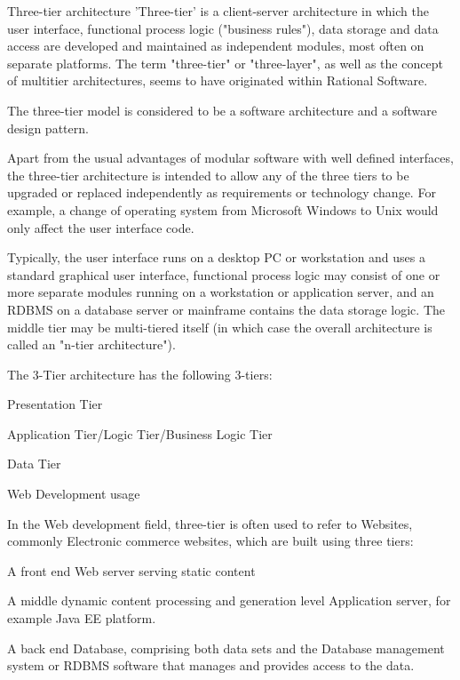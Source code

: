 \begin{obecne}{Three-tier architecture}
'Three-tier' is a client-server architecture in which the user interface, functional process logic ("business rules"), data storage and data access are developed and maintained as independent modules, most often on separate platforms. The term "three-tier" or "three-layer", as well as the concept of multitier architectures, seems to have originated within Rational Software.

The three-tier model is considered to be a software architecture and a software design pattern.

Apart from the usual advantages of modular software with well defined interfaces, the three-tier architecture is intended to allow any of the three tiers to be upgraded or replaced independently as requirements or technology change. For example, a change of operating system from Microsoft Windows to Unix would only affect the user interface code.

Typically, the user interface runs on a desktop PC or workstation and uses a standard graphical user interface, functional process logic may consist of one or more separate modules running on a workstation or application server, and an RDBMS on a database server or mainframe contains the data storage logic. The middle tier may be multi-tiered itself (in which case the overall architecture is called an "n-tier architecture").

The 3-Tier architecture has the following 3-tiers:
\begin{pitemize}
    \item Presentation Tier
    \item Application Tier/Logic Tier/Business Logic Tier
    \item Data Tier
\end{pitemize}
\end{obecne}


\begin{obecne}{Web Development usage}

In the Web development field, three-tier is often used to refer to Websites, commonly Electronic commerce websites, which are built using three tiers:
\begin{pitemize}
    \item A front end Web server serving static content
    \item A middle dynamic content processing and generation level Application server, for example Java EE platform.
    \item A back end Database, comprising both data sets and the Database management system or RDBMS software that manages and provides access to the data.
\end{pitemize}
\end{obecne}

